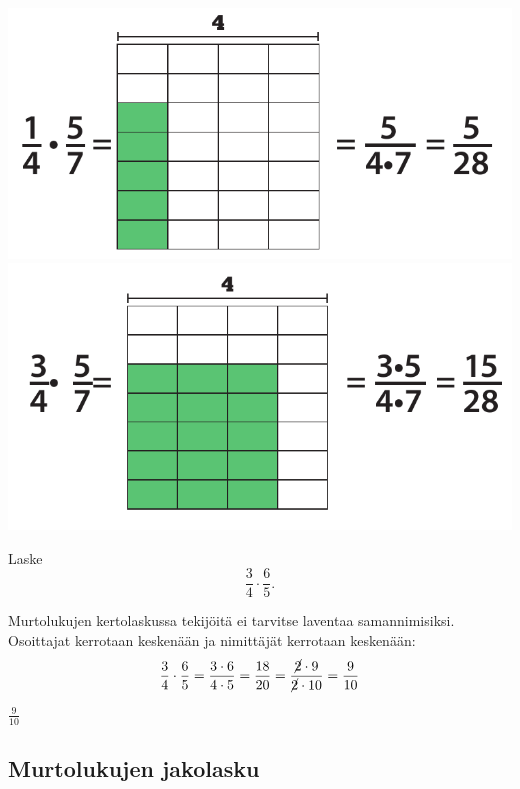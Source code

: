 \includegraphics[scale=0.4]{pictures/Kuva3-1-4.pdf}
\includegraphics[scale=0.4]{pictures/Kuva3-1-5.pdf}    
    
\begin{esimerkki}
	Laske
	\[
        \frac{3}{4}\cdot \frac{6}{5}.
        \]
	
        \begin{esimratk}
        Murtolukujen kertolaskussa tekijöitä ei tarvitse laventaa samannimisiksi. Osoittajat kerrotaan keskenään ja nimittäjät kerrotaan keskenään:
      \[
        \frac{3}{4}\cdot \frac{6}{5}= \frac{3\cdot 6}{4\cdot 5}= \frac{18}{20}=\frac{\cancel{2}\cdot 9}{\cancel{2}\cdot 10}=\frac{9}{10}
        \]
        \end{esimratk}
        \begin{esimvast}
        $\frac{9}{10}$
        \end{esimvast}
    \end{esimerkki}
    


\subsection{Murtolukujen jakolasku}

